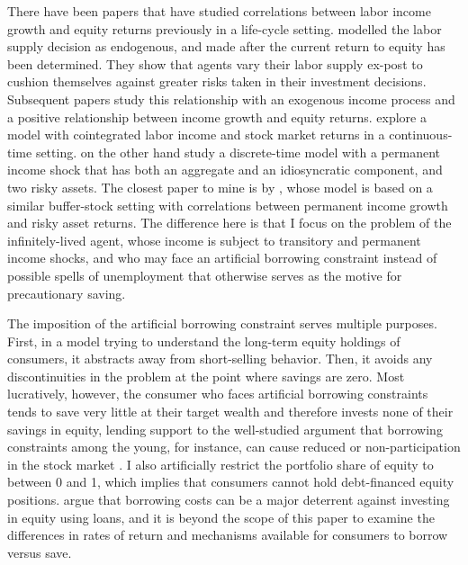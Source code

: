 There have been papers that have studied correlations between labor income growth and equity returns previously in a life-cycle setting. \citet{Bodie1992} modelled the labor supply decision as endogenous, and made after the current return to equity has been determined. They show that agents vary their labor supply ex-post to cushion themselves against greater risks taken in their investment decisions. Subsequent papers study this relationship with an exogenous income process and a positive relationship between income growth and equity returns. \citet{Benzoni2007} explore a model with cointegrated labor income and stock market returns in a continuous-time setting. \citet{Bagliano2014} on the other hand study a discrete-time model with a permanent income shock that has both an aggregate and an idiosyncratic component, and two risky assets. The closest paper to mine is by \citet{Viceira2001}, whose model is based on a similar buffer-stock setting with correlations between permanent income growth and risky asset returns. The difference here is that I focus on the problem of the infinitely-lived agent, whose income is subject to transitory and permanent income shocks, and who may face an artificial borrowing constraint instead of possible spells of unemployment that otherwise serves as the motive for precautionary saving.

The imposition of the artificial borrowing constraint serves multiple purposes. First, in a model trying to understand the long-term equity holdings of consumers, it abstracts away from short-selling behavior. Then, it avoids any discontinuities in the problem at the point where savings are zero. Most lucratively, however, the consumer who faces artificial borrowing constraints tends to save very little at their target wealth and therefore invests none of their savings in equity, lending support to the well-studied argument that borrowing constraints among the young, for instance, can cause reduced or non-participation in the stock market \citep{Constantinides2002, Haliassos1998, Kogan2007, Jang2015, Harenberg2018}. I also artificially restrict the portfolio share of equity to between 0 and 1, which implies that consumers cannot hold debt-financed equity positions. \citet{Davis2006} argue that borrowing costs can be a major deterrent against investing in equity using loans, and it is beyond the scope of this paper to examine the differences in rates of return and mechanisms available for consumers to borrow versus save.

